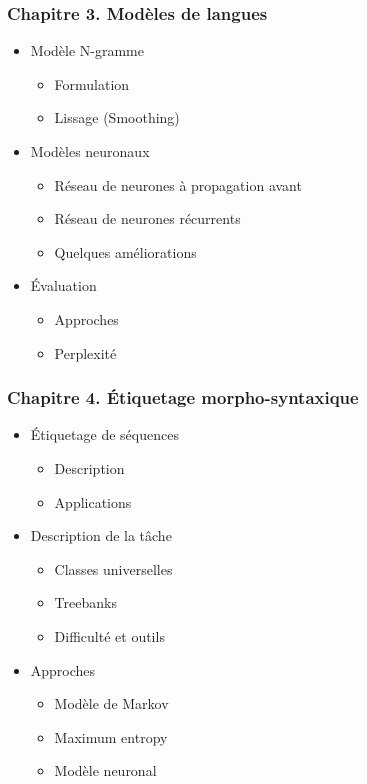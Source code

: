 \documentclass[11pt, a4paper]{article}
\begin{document}
\begin{tcolorbox}
\subsubsection*{Chapitre 3. Modèles de langues}
	
\begin{multicols}{2}
	\begin{itemize}	
		\item Modèle N-gramme
		\begin{itemize}
			\item Formulation
			\item Lissage (Smoothing)
		\end{itemize}
		\item Modèles neuronaux
		\begin{itemize}
			\item Réseau de neurones à propagation avant
			\item Réseau de neurones récurrents
			\item Quelques améliorations
		\end{itemize}
		\item Évaluation
		\begin{itemize}
			\item Approches
			\item Perplexité
		\end{itemize}
	\end{itemize}
\end{multicols}
\end{tcolorbox}

\begin{tcolorbox}
\subsubsection*{Chapitre 4. Étiquetage morpho-syntaxique}

\begin{multicols}{2}
\begin{itemize}
	\item \'Etiquetage de séquences
	\begin{itemize}
		\item Description
		\item Applications
	\end{itemize}
	\item Description de la tâche
	\begin{itemize}
		\item Classes universelles
		\item Treebanks
		\item Difficulté et outils
	\end{itemize}
	\item Approches
	\begin{itemize}
		\item Modèle de Markov
		\item Maximum entropy
		\item Modèle neuronal
	\end{itemize}
\end{itemize}
\end{multicols}
\end{tcolorbox}
\end{document}
